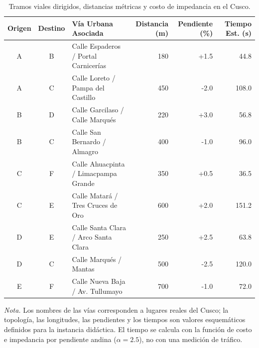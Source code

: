 \begin{table}[H]
    \centering
    \fontsize{10}{12.5}\selectfont
    \setlength{\tabcolsep}{4pt}
    \caption{Tramos viales dirigidos, distancias métricas y costo de impedancia en el Cusco.}
    \label{tab:aristas_cusco}
    \begin{tabularx}{\textwidth}{@{}ccXrrr@{}}
        \toprule
        \textbf{Origen} & \textbf{Destino} & \textbf{Vía Urbana Asociada} & \textbf{Distancia (m)} & \textbf{Pendiente (\%)} & \textbf{Tiempo Est. (s)} \\
        \midrule
        A & B & Calle Espaderos / Portal Carnicerías & 180 & +1.5 & 44.8 \\
        A & C & Calle Loreto / Pampa del Castillo & 450 & -2.0 & 108.0 \\
        B & D & Calle Garcilaso / Calle Marqués & 220 & +3.0 & 56.8 \\
        B & C & Calle San Bernardo / Almagro & 400 & -1.0 & 96.0 \\
        C & F & Calle Ahuacpinta / Limacpampa Grande & 350 & +0.5 & 36.5 \\
        C & E & Calle Matará / Tres Cruces de Oro & 600 & +2.0 & 151.2 \\
        D & E & Calle Santa Clara / Arco Santa Clara & 250 & +2.5 & 63.8 \\
        D & C & Calle Marqués / Mantas & 500 & -2.5 & 120.0 \\
        E & F & Calle Nueva Baja / Av. Tullumayo & 700 & -1.0 & 72.0 \\
        \bottomrule
    \end{tabularx}
    \par\vspace{0.15cm}
    \raggedright
    \textit{Nota.} Los nombres de las vías corresponden a lugares reales del Cusco; la topología, las longitudes, las pendientes y los tiempos son valores esquemáticos definidos para la instancia didáctica. El tiempo se calcula con la función de costo e impedancia por pendiente andina ($\alpha = 2.5$), no con una medición de tráfico.
\end{table}
